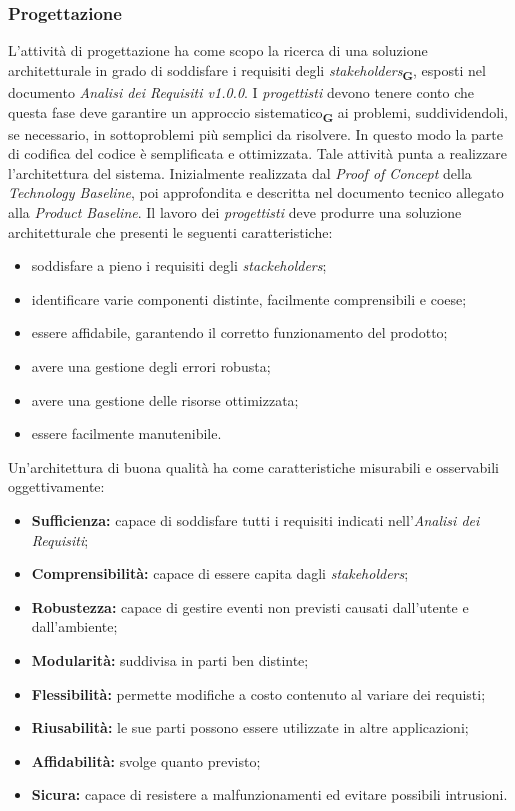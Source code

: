 \subsubsection{Progettazione}
L'attività di progettazione ha come scopo la ricerca di una soluzione architetturale in grado di soddisfare i requisiti degli \textit{stakeholders}\textsubscript{\textbf{G}}, esposti nel documento \textit{Analisi dei Requisiti v1.0.0}.
I \textit{progettisti} devono tenere conto che questa fase deve garantire un approccio sistematico\textsubscript{\textbf{G}} ai problemi, suddividendoli, se necessario, in sottoproblemi più semplici da risolvere.
In questo modo la parte di codifica del codice è semplificata e ottimizzata.
Tale attività punta a realizzare l'architettura del sistema. Inizialmente realizzata dal
\textit{Proof of Concept} della \textit{Technology Baseline}, poi approfondita e descritta nel documento
tecnico allegato alla \textit{Product Baseline}.
Il lavoro dei \textit{progettisti} deve produrre una soluzione architetturale che presenti le seguenti caratteristiche:
\begin{itemize}
    \item soddisfare a pieno i requisiti degli \textit{stackeholders};
    \item identificare varie componenti distinte, facilmente comprensibili e coese;
    \item essere affidabile, garantendo il corretto funzionamento del prodotto;
    \item avere una gestione degli errori robusta;
    \item avere una gestione delle risorse ottimizzata;
    \item essere facilmente manutenibile.
\end{itemize}
Un'architettura di buona qualità ha come caratteristiche misurabili e osservabili oggettivamente:
\begin{itemize}
    \item \textbf{Sufficienza:} capace di soddisfare tutti i requisiti indicati nell'\textit{Analisi dei Requisiti};
    \item \textbf{Comprensibilità:} capace di essere capita dagli \textit{stakeholders};
    \item \textbf{Robustezza:} capace di gestire eventi non previsti causati dall'utente e dall'ambiente;
    \item \textbf{Modularità:} suddivisa in parti ben distinte;
    \item \textbf{Flessibilità:} permette modifiche a costo contenuto al variare dei requisti;
    \item \textbf{Riusabilità:} le sue parti possono essere utilizzate in altre applicazioni;
    \item \textbf{Affidabilità:} svolge quanto previsto;
    \item \textbf{Sicura:} capace di resistere a malfunzionamenti ed evitare possibili intrusioni.
\end{itemize}

